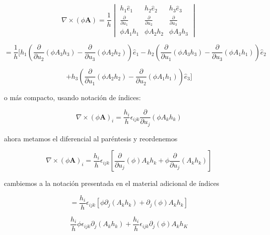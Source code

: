 \documentclass[12pt,a4paper]{article}
\begin{document}
\begin{enumerate}
    \begin{equation*}
    \nabla \times (\phi \textbf{A}) =  \frac{1}{h}
        \begin{vmatrix}
        h_1 \hat{e}_1 & h_2 \hat{e}_2 & h_3 \hat{e}_3\\
        \frac{\partial}{\partial u_1} & \frac{\partial }{\partial u_2} & \frac{\partial}{\partial u_3}\\
        \phi A_1 h_1 & \phi A_2 h_2 & \phi A_3 h_3
        \end{vmatrix}
    \end{equation*}
    
    \begin{equation*}
        = \frac{1}{h} [h_1 \left(\frac{\partial}{\partial u_2}( \phi A_3 h_3) - \frac{\partial }{\partial u_3} (\phi A_2 h_2) \right) \hat{e}_1 - h_2 \left(\frac{\partial}{\partial u_1}( \phi A_3 h_3) - \frac{\partial }{\partial u_3} (\phi A_1 h_1) \right) \hat{e}_2 
    \end{equation*}
    
    \begin{equation*}
         + h_3 \left(\frac{\partial}{\partial u_1}( \phi A_2 h_2) - \frac{\partial }{\partial u_2} (\phi A_1 h_1) \right) \hat{e}_3 ]
    \end{equation*}
    
    o más compacto, usando notación de índices:
    
    \begin{equation*}
        \nabla \times (\phi \textbf{A})_i = \frac{h_i}{h} \epsilon_{ijk} \frac{\partial}{\partial u_j}(\phi A_k h_k) 
    \end{equation*}
    
    ahora metamos el diferencial al paréntesis y reordenemos
    
    \begin{equation*}
        \nabla \times (\phi \textbf{A})_i =\frac{h_i}{h} \epsilon_{ijk} \left[\frac{\partial }{\partial u_j} (\phi) A_k h_k + \phi \frac{\partial}{\partial u_j} (A_k h_k) \right]
    \end{equation*}
    
    cambiemos a la notación presentada en el material adicional de índices
    
    \begin{equation*}
        = \frac{h_i}{h} \epsilon_{ijk} \left[\phi \partial_j (A_k h_k) + \partial_j (\phi) A_k h_k \right]
    \end{equation*}
    
    \begin{equation*}
        \frac{h_i}{h} \phi \epsilon_{ijk} \partial_j (A_k h_k) + \frac{h_i}{h} \epsilon_{ijk} \partial_j(\phi) A_k h_K
    \end{equation*}
    

\end{enumerate}
\end{document}
